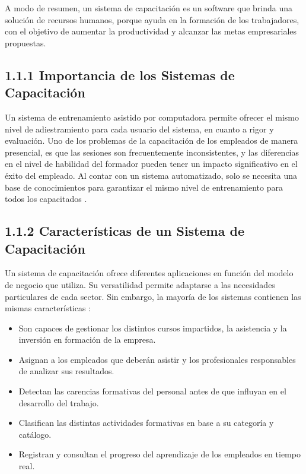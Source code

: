 \documentclass[12pt,a4paper]{report}
\begin{document}
A modo de resumen, un sistema de capacitación es un software que brinda una solución de recursos humanos, porque ayuda en la formación de los trabajadores, con el objetivo de aumentar la productividad y alcanzar las metas empresariales propuestas.

\subsection*{1.1.1 Importancia de los Sistemas de Capacitación}
Un sistema de entrenamiento asistido por computadora permite ofrecer el mismo nivel de adiestramiento para cada usuario del sistema, en cuanto a rigor y evaluación. Uno de los problemas de la capacitación de los empleados de manera presencial, es que las sesiones son frecuentemente inconsistentes, y las diferencias en el nivel de habilidad del formador pueden tener un impacto significativo en el éxito del empleado. Al contar con un sistema automatizado, solo se necesita una base de conocimientos para garantizar el mismo nivel de entrenamiento para todos los capacitados \cite{cap2002}.

\subsection*{1.1.2 Características de un Sistema de Capacitación}
Un sistema de capacitación ofrece diferentes aplicaciones en función del modelo de negocio que utiliza. Su versatilidad permite adaptarse a las necesidades particulares de cada sector. Sin embargo, la mayoría de los sistemas contienen las mismas características \cite{softDoit}:
\begin{itemize}
\item Son capaces de gestionar los distintos cursos impartidos, la asistencia y la inversión en formación de la empresa.
\item Asignan a los empleados que deberán asistir y los profesionales responsables de analizar sus resultados.
\item Detectan las carencias formativas del personal antes de que influyan en el desarrollo del trabajo.
\item Clasifican las distintas actividades formativas en base a su categoría y catálogo.
\item Registran y consultan el progreso del aprendizaje de los empleados en tiempo real.
\end{itemize}
\end{document}
